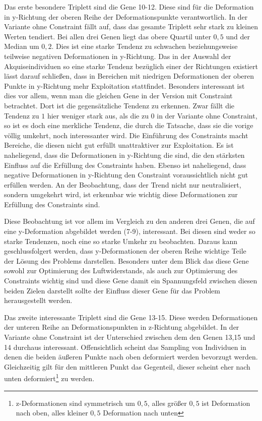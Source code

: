 Das erste besondere Triplett sind die Gene 10-12.
Diese sind für die Deformation in y-Richtung der oberen Reihe der Deformationspunkte verantwortlich.
In der Variante ohne Constraint fällt auf, dass das gesamte Triplett sehr stark zu kleinen Werten tendiert. 
Bei allen drei Genen liegt das obere Quartil unter $0,5$ und der Median um $0,2$.
Dies ist eine starke Tendenz zu schwachen beziehungsweise teilweise negativen Deformationen in y-Richtung.
Das in der Auswahl der Akquiseindividuen so eine starke Tendenz bezüglich einer der Richtungen existiert lässt darauf schließen, dass in Bereichen mit niedrigen Deformationen der oberen Punkte in y-Richtung mehr Exploitation stattfindet.
Besonders interessant ist dies vor allem, wenn man die gleichen Gene in der Version mit Constraint betrachtet.
Dort ist die gegensätzliche Tendenz zu erkennen.
Zwar fällt die Tendenz zu $1$ hier weniger stark aus, als die zu $0$ in der Variante ohne Constraint, so ist es doch eine merkliche Tendenz, die durch die Tatsache, dass sie die vorige völlig umkehrt, noch interessanter wird.
Die Einführung des Constraints macht Bereiche, die diesen nicht gut erfüllt unattraktiver zur Exploitation.
Es ist naheliegend, dass die Deformationen in y-Richtung die sind, die den stärksten Einfluss auf die Erfüllung des Constraints haben.
Ebenso ist naheliegend, dass negative Deformationen in y-Richtung den Constraint voraussichtlich nicht gut erfüllen werden.
An der Beobachtung, dass der Trend nicht nur neutralisiert, sondern umgekehrt wird, ist erkennbar wie wichtig diese Deformationen zur Erfüllung des Constraints sind.

Diese Beobachtung ist vor allem im Vergleich zu den anderen drei Genen, die auf eine y-Deformation abgebildet werden (7-9), interessant.
Bei diesen sind weder so starke Tendenzen, noch eine so starke Umkehr zu beobachten.
Daraus kann geschlussfolgert werden, dass y-Deformationen der oberen Reihe wichtige Teile der Lösung des Problems darstellen.
Besonders unter dem Blick das diese Gene sowohl zur Optimierung des Luftwiderstands, als auch zur Optimierung des Constraints wichtig sind und diese Gene damit ein Spannungsfeld zwischen diesen beiden Zielen darstellt sollte der Einfluss dieser Gene für das Problem herausgestellt werden.

Das zweite interessante Triplett sind die Gene 13-15.
Diese werden Deformationen der unteren Reihe an Deformationspunkten in z-Richtung abgebildet.
In der Variante ohne Constraint ist der Unterschied zwischen dem den Genen 13,15 und 14 durchaus interessant.
Offensichtlich scheint das Sampling von Individuen in denen die beiden äußeren Punkte nach oben deformiert werden bevorzugt werden.
Gleichzeitig gilt für den mittleren Punkt das Gegenteil, dieser scheint eher nach unten deformiert\footnote{z-Deformationen sind symmetrisch um $0,5$, alles größer $0,5$ ist Deformation nach oben, alles kleiner $0,5$ Deformation nach unten} zu werden.

